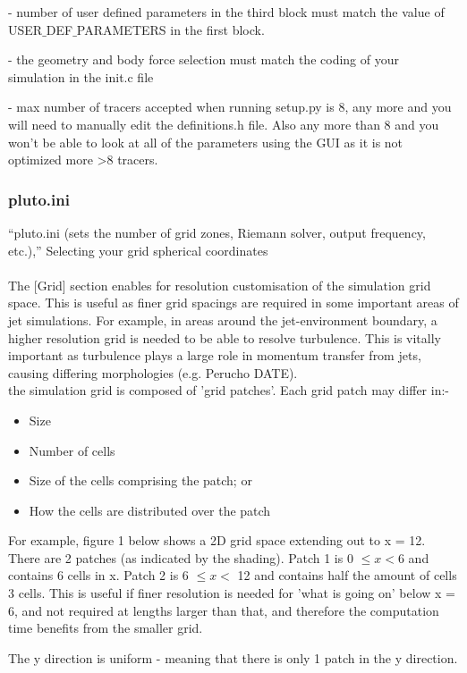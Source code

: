 \documentclass[12pt]{article}
\begin{document}
- number of user defined parameters in the third block must match the value of USER$\_$DEF$\_$PARAMETERS in the first block.

- the geometry and body force selection must match the coding of your simulation in the init.c file

- max number of tracers accepted when running setup.py is 8, any more and you will need to manually edit the definitions.h file. Also any more than 8 and you won't be able to look at all of the parameters using the GUI as it is not optimized more >8 tracers.

\subsubsection{pluto.ini}
“pluto.ini (sets the number of grid zones, Riemann solver, output frequency, etc.),”
Selecting your grid
spherical coordinates\\
\\
The [Grid] section enables for resolution customisation of the simulation grid space. This is useful as finer grid spacings are required in some important areas of jet simulations. For example, in areas around the jet-environment boundary, a higher resolution grid is needed to be able to resolve turbulence. This is vitally important as turbulence plays a large role in momentum transfer from jets, causing differing morphologies (e.g. Perucho DATE). \\
the simulation grid is composed of 'grid patches'. Each grid patch may differ in:- 
\begin{itemize}
\item Size
\item Number of cells
\item Size of the cells comprising the patch; or
\item How the cells are distributed over the patch
\end{itemize}
For example, figure 1 below shows a 2D grid space extending out to x = 12.  There are 2 patches (as indicated by the shading). Patch 1 is 0 $\leq x < 6$ and contains 6 cells in x. Patch 2 is 6 $\leq x <$ 12 and contains half the amount of cells 3 cells. This is useful if finer resolution is needed for 'what is going on' below x = 6, and not required at lengths larger than that, and therefore the computation time benefits from the smaller grid.


The y direction is uniform - meaning that there is only 1 patch in the y direction.
\end{document}

